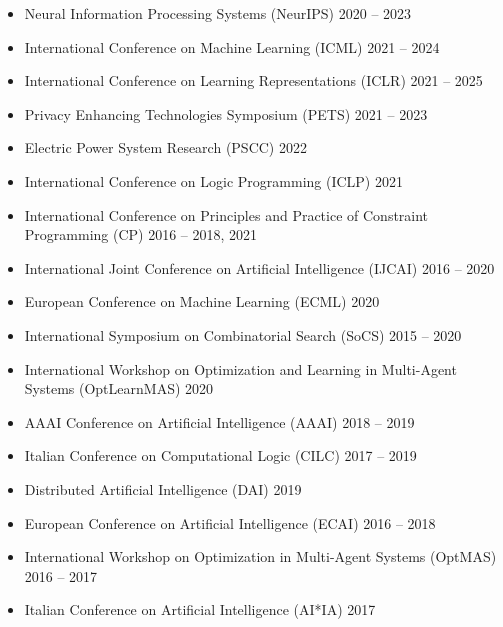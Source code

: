 \begin{itemize}
  \item Neural Information Processing Systems (NeurIPS) 
  \hfill {2020 -- 2023}

  \item International Conference on Machine Learning (ICML) 
  \hfill{2021 -- 2024} 

  \item International Conference on Learning Representations (ICLR)
  \hfill{2021 -- 2025}

  \item Privacy Enhancing Technologies Symposium (PETS) 
  \hfill {2021 -- 2023}

  \item Electric Power System Research (PSCC)
  \hfill{2022}

  \item International Conference on Logic Programming (ICLP) 
  \hfill {2021}

  \item International Conference on Principles and Practice of Constraint Programming (CP) 
  \hfill{2016 -- 2018, 2021} 

  \item International Joint Conference on Artificial Intelligence (IJCAI) 
  \hfill {2016 -- 2020}

  \item European Conference on Machine Learning (ECML) 
  \hfill {2020}

  \item International Symposium on Combinatorial Search (SoCS) 
  \hfill {2015 -- 2020}

  \item International Workshop on Optimization and Learning in 
        Multi-Agent Systems (OptLearnMAS) 
  \hfill {2020}

  \item AAAI Conference on Artificial Intelligence (AAAI) 
  \hfill {2018 -- 2019}

  \item Italian Conference on Computational Logic (CILC) 
  \hfill {2017 -- 2019}

  \item Distributed Artificial Intelligence (DAI) 
  \hfill {2019}

  \item European Conference on Artificial Intelligence (ECAI) 
  \hfill {2016 -- 2018}

  \item International Workshop on Optimization in Multi-Agent Systems (OptMAS) 
  \hfill {2016 -- 2017}

  \item Italian Conference on Artificial Intelligence (AI*IA) 
  \hfill {2017}
\end{itemize}


